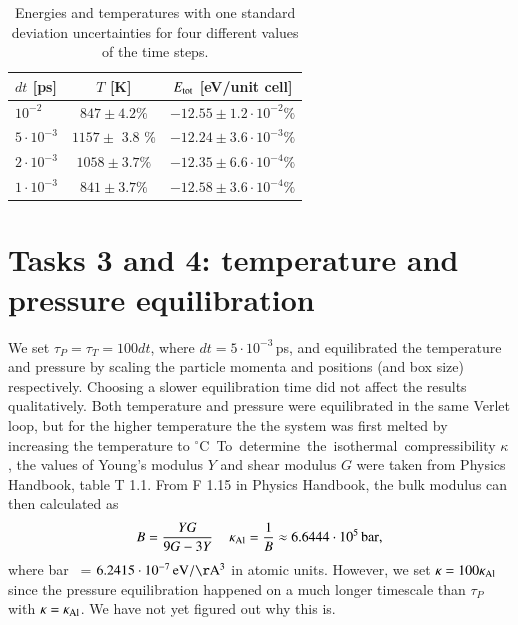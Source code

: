 \begin{table}[!ht]
  \begin{center}
    \caption{Energies and temperatures with one standard deviation uncertainties for four different values of the time steps.}
    \begin{tabular}{l c c} 
    $dt$ [ps] & $T$ [K] & $E_{\rm tot}$ [eV/unit cell]\\ \hline
$10^{-2}$ & 	$847 \pm 4.2\%$ &	$-12.55 \pm 1.2\cdot 10^{-2} \% $\\
$5\cdot 10^{-3}$ &	$1157 \pm$ 3.8 \% &$-12.24 \pm 3.6\cdot 10^{-3} \%$ \\
$2\cdot 10^{-3}$ & $1058  \pm 3.7 \% $ & 	$ -12.35 \pm 6.6\cdot 10^{-4} \% $\\ 
$1\cdot 10^{-3}$ & $ 841  \pm 3.7 \% $	 &$ -12.58 \pm 3.6\cdot 10^{-4} \%$ \\ 
      \hline
    \end{tabular}
    \label{tab:task2}
  \end{center}
\end{table}


\section*{Tasks 3 and 4: temperature and pressure equilibration}
We set $\tau_P = \tau_T = 100 dt$, where $dt = 5\cdot 10^{-3}$\,ps, and equilibrated the temperature and pressure by scaling the particle momenta and positions (and box size) respectively. Choosing a slower equilibration time did not affect the results qualitatively. Both temperature and pressure were equilibrated in the same Verlet loop, but for the higher temperature the the system was first melted by increasing the temperature to \unit[900]{$^\circ$C}. To determine the isothermal compressibility $\kappa$, 
the values of Young's modulus $Y$ and shear modulus $G$ were taken from Physics Handbook, table T 1.1. From F 1.15 in Physics Handbook, the bulk modulus can then calculated as
\begin{equation}
B = \frac{YG}{9G - 3Y} \,\quad \kappa_{\rm Al} = \frac{1}{B} \approx \unit[6.6444\cdot 10^5]{bar},
\end{equation}
where \unit[1]{bar } = $\unit[6.2415\cdot 10^{-7}]{eV/\AA^3}$ in atomic units. However, we set $\kappa = 100 \kappa_{\rm Al}$ since the pressure equilibration happened on a much longer timescale than $\tau_P$ with $\kappa = \kappa_{\rm Al}$. We have not yet figured out why this is. 

